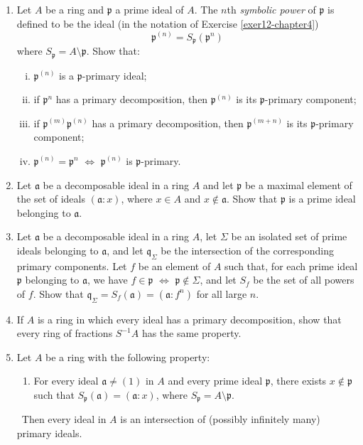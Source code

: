 \begin{enumerate}
    \item \label{exer13-chapter4}Let $A$ be a ring and $\mathfrak{p}$ a prime ideal of $A$. The $n$th \emph{symbolic power} of $\mathfrak{p}$ is defined to be the ideal (in the notation of Exercise \ref{exer12-chapter4})
    \[
    \mathfrak{p}^{(n)} = S_{\mathfrak{p}}(\mathfrak{p}^n)
    \]
    where $S_{\mathfrak{p}} = A \setminus \mathfrak{p}$. Show that:
    \begin{enumerate}[i)]
        \item $\mathfrak{p}^{(n)}$ is a $\mathfrak{p}$-primary ideal;
        \item if $\mathfrak{p}^n$ has a primary decomposition, then $\mathfrak{p}^{(n)}$ is its $\mathfrak{p}$-primary component;
        \item if $\mathfrak{p}^{(m)} \mathfrak{p}^{(n)}$ has a primary decomposition, then $\mathfrak{p}^{(m+n)}$ is its $\mathfrak{p}$-primary component;
        \item $\mathfrak{p}^{(n)} = \mathfrak{p}^n$ $\iff$ $\mathfrak{p}^{(n)}$ is $\mathfrak{p}$-primary.
    \end{enumerate}

    \item \label{exer14-chapter4}Let $\mathfrak{a}$ be a decomposable ideal in a ring $A$ and let $\mathfrak{p}$ be a maximal element of the set of ideals $(\mathfrak{a} : x)$, where $x \in A$ and $x \notin \mathfrak{a}$. Show that $\mathfrak{p}$ is a prime ideal belonging to $\mathfrak{a}$.

    \item \label{exer15-chapter4}Let $\mathfrak{a}$ be a decomposable ideal in a ring $A$, let $\Sigma$ be an isolated set of prime ideals belonging to $\mathfrak{a}$, and let $\mathfrak{q}_{\Sigma}$ be the intersection of the corresponding primary components. Let $f$ be an element of $A$ such that, for each prime ideal $\mathfrak{p}$ belonging to $\mathfrak{a}$, we have $f \in \mathfrak{p}$ $\iff$ $\mathfrak{p} \notin \Sigma$, and let $S_f$ be the set of all powers of $f$. Show that $\mathfrak{q}_{\Sigma} = S_f(\mathfrak{a}) = (\mathfrak{a} : f^n)$ for all large $n$.

    \item \label{exer16-chapter4}If $A$ is a ring in which every ideal has a primary decomposition, show that every ring of fractions $S^{-1}A$ has the same property.

    \item \label{exer17-chapter4}Let $A$ be a ring with the following property:
    \begin{enumerate}
        \item[(L1)] For every ideal $\mathfrak{a} \neq (1)$ in $A$ and every prime ideal $\mathfrak{p}$, there exists $x \notin \mathfrak{p}$ such that $S_{\mathfrak{p}}(\mathfrak{a}) = (\mathfrak{a} : x)$, where $S_{\mathfrak{p}} = A \setminus \mathfrak{p}$.
    \end{enumerate}
    \quad\, Then every ideal in $A$ is an intersection of (possibly infinitely many) primary ideals.


\end{enumerate}

